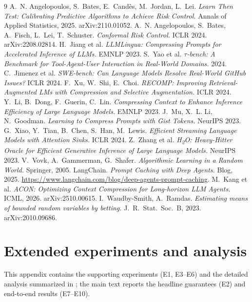 \documentclass{article}
\begin{document}
\begin{thebibliography}{9}
 A.~N. Angelopoulos, S.~Bates, E.~Cand\`es, M.~Jordan, L.~Lei.
\emph{Learn Then Test: Calibrating Predictive Algorithms to Achieve Risk Control.}
Annals of Applied Statistics, 2025. arXiv:2110.01052.
 A.~N. Angelopoulos, S.~Bates, A.~Fisch, L.~Lei, T.~Schuster.
\emph{Conformal Risk Control.} ICLR 2024. arXiv:2208.02814.
 H.~Jiang et al. \emph{LLMLingua: Compressing Prompts for
Accelerated Inference of LLMs.} EMNLP 2023.
 S.~Yao et al. \emph{$\tau$-bench: A Benchmark for Tool-Agent-User
Interaction in Real-World Domains.} 2024.
 C.~Jimenez et al. \emph{SWE-bench: Can Language Models Resolve
Real-World GitHub Issues?} ICLR 2024.
 F.~Xu, W.~Shi, E.~Choi. \emph{RECOMP: Improving
Retrieval-Augmented LMs with Compression and Selective Augmentation.} ICLR 2024.
 Y.~Li, B.~Dong, F.~Guerin, C.~Lin. \emph{Compressing Context
to Enhance Inference Efficiency of Large Language Models.} EMNLP 2023.
 J.~Mu, X.~L. Li, N.~Goodman. \emph{Learning to Compress Prompts with
Gist Tokens.} NeurIPS 2023.
 G.~Xiao, Y.~Tian, B.~Chen, S.~Han, M.~Lewis. \emph{Efficient
Streaming Language Models with Attention Sinks.} ICLR 2024.
 Z.~Zhang et al. \emph{H\textsubscript{2}O: Heavy-Hitter Oracle for
Efficient Generative Inference of Large Language Models.} NeurIPS 2023.
 V.~Vovk, A.~Gammerman, G.~Shafer. \emph{Algorithmic Learning in a Random
World.} Springer, 2005.
 LangChain. \emph{Prompt Caching with Deep Agents.} Blog, 2025.
\url{https://www.langchain.com/blog/deep-agents-prompt-caching}.
 M.~Kang et al. \emph{ACON: Optimizing Context Compression for Long-horizon
LLM Agents.} ICML, 2026. arXiv:2510.00615.
 I.~Waudby-Smith, A.~Ramdas. \emph{Estimating means of bounded random variables
by betting.} J.~R.~Stat.~Soc.~B, 2023. arXiv:2010.09686.
\end{thebibliography}

\appendix
\section{Extended experiments and analysis}
\label{app:extended}
This appendix contains the supporting experiments (E1, E3--E6) and the detailed analysis summarized in ; the main text reports the headline guarantees (E2) and end-to-end results (E7--E10).
\end{document}
